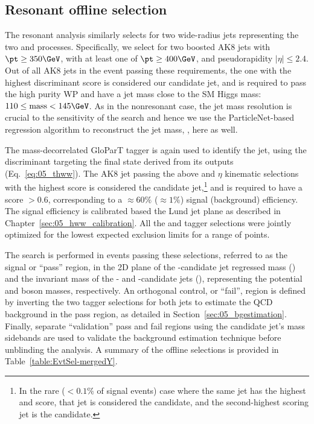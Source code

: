 \subsection{Resonant offline selection}
\label{sec:05_selection_resonant}

The resonant analysis similarly selects for two wide-radius jets representing the two \hbb and \yvv processes.
Specifically, we select for two boosted AK8 jets with $\pt \geq 350\GeV$, with at least one of $\pt \geq 400 \GeV$, and pseudorapidity $|\eta| \leq 2.4$.
Out of all AK8 jets in the event passing these requirements, the one with the highest \TXbb discriminant score is considered our \hbb candidate jet, and is required to pass the high purity WP and have a jet mass close to the SM Higgs mass: $110 \leq \mathrm{mass} < 145\GeV$.
As in the nonresonant case, the jet mass resolution is crucial to the sensitivity of the search and hence we use the ParticleNet-based regression algorithm to reconstruct the jet mass, \mreg, here as well.

The mass-decorrelated GloParT tagger is again used to identify the \yvvq jet, using the discriminant \THWW targeting the \VVq final state derived from its outputs (Eq.~\ref{eq:05_thww}).
The AK8 jet passing the above \pt and $\eta$ kinematic selections with the highest \THWW score is considered the \yvv candidate jet,\footnote{\label{bbvvconflictnote}In the rare ($<0.1\%$ of signal events) case where the same jet has the highest \TXbb and \THWW score, that jet is considered the \hbb candidate, and the second-highest \THWW scoring jet is the \yvv candidate.}
and is required to have a \THWW score $> 0.6$, corresponding to a $\approx 60\%$ ($\approx 1\%$) signal (background) efficiency.
The signal efficiency is calibrated based the Lund jet plane as described in Chapter~\ref{sec:05_hww_calibration}.
All the \pt and tagger selections were jointly optimized for the lowest expected exclusion limits for a range of \mxmy points.

The search is performed in events passing these selections, referred to as the signal or ``pass'' region, in the 2D plane of the \VV-candidate jet regressed mass (\mregvv) and the invariant mass of the \bbbar- and \VV-candidate jets (\mjj), representing the potential \PY and \PX boson masses, respectively.
An orthogonal control, or ``fail'', region is defined by inverting the two tagger selections for both jets to estimate the QCD background in the pass region, as detailed in Section~\ref{sec:05_bgestimation}.
Finally, separate ``validation'' pass and fail regions using the \hbb candidate jet's mass sidebands are used to validate the background estimation technique before unblinding the analysis.
A summary of the offline selections is provided in Table~\ref{table:EvtSel-mergedY}.


